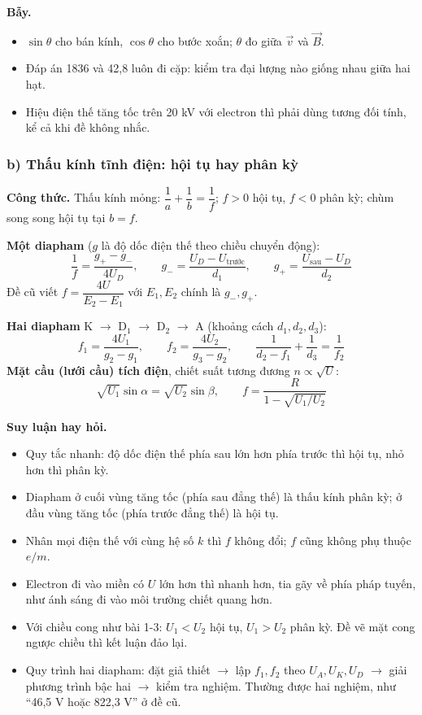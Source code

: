 \documentclass[11pt,a4paper]{article}
\begin{document}
\textbf{Bẫy.}
\begin{itemize}
    \item $\sin\theta$ cho bán kính, $\cos\theta$ cho bước xoắn; $\theta$ đo giữa $\vec v$ và $\vec B$.
    \item Đáp án 1836 và 42,8 luôn đi cặp: kiểm tra đại lượng nào giống nhau giữa hai hạt.
    \item Hiệu điện thế tăng tốc trên 20 kV với electron thì phải dùng tương đối tính, kể cả khi đề không nhắc.
\end{itemize}

\subsubsection*{b) Thấu kính tĩnh điện: hội tụ hay phân kỳ}

\textbf{Công thức.}
Thấu kính mỏng: $\dfrac1a+\dfrac1b=\dfrac1f$; $f>0$ hội tụ, $f<0$ phân kỳ; chùm song song hội tụ tại $b=f$.

\textbf{Một diapham} ($g$ là độ dốc điện thế theo chiều chuyển động):
\begin{equation*}
    \frac1f=\frac{g_+-g_-}{4U_D},\qquad g_-=\frac{U_D-U_{\text{trước}}}{d_1},\qquad g_+=\frac{U_{\text{sau}}-U_D}{d_2}
\end{equation*}
Đề cũ viết $f=\dfrac{4U}{E_2-E_1}$ với $E_1, E_2$ chính là $g_-, g_+$.

\textbf{Hai diapham} K $\to$ D$_1$ $\to$ D$_2$ $\to$ A (khoảng cách $d_1, d_2, d_3$):
\begin{equation*}
    f_1=\frac{4U_1}{g_2-g_1},\qquad f_2=\frac{4U_2}{g_3-g_2},\qquad \frac1{d_2-f_1}+\frac1{d_3}=\frac1{f_2}
\end{equation*}
\textbf{Mặt cầu (lưới cầu) tích điện}, chiết suất tương đương $n\propto\sqrt U$:
\begin{equation*}
    \sqrt{U_1}\sin\alpha=\sqrt{U_2}\sin\beta,\qquad f=\frac{R}{1-\sqrt{U_1/U_2}}
\end{equation*}

\textbf{Suy luận hay hỏi.}
\begin{itemize}
    \item Quy tắc nhanh: độ dốc điện thế phía sau lớn hơn phía trước thì hội tụ, nhỏ hơn thì phân kỳ.
    \item Diapham ở cuối vùng tăng tốc (phía sau đẳng thế) là thấu kính phân kỳ; ở đầu vùng tăng tốc (phía trước đẳng thế) là hội tụ.
    \item Nhân mọi điện thế với cùng hệ số $k$ thì $f$ không đổi; $f$ cũng không phụ thuộc $e/m$.
    \item Electron đi vào miền có $U$ lớn hơn thì nhanh hơn, tia gãy về phía pháp tuyến, như ánh sáng đi vào môi trường chiết quang hơn.
    \item Với chiều cong như bài 1-3: $U_1<U_2$ hội tụ, $U_1>U_2$ phân kỳ. Đề vẽ mặt cong ngược chiều thì kết luận đảo lại.
    \item Quy trình hai diapham: đặt giả thiết $\to$ lập $f_1, f_2$ theo $U_A, U_K, U_D$ $\to$ giải phương trình bậc hai $\to$ kiểm tra nghiệm. Thường được hai nghiệm, như ``46,5 V hoặc 822,3 V'' ở đề cũ.
\end{itemize}
\end{document}
